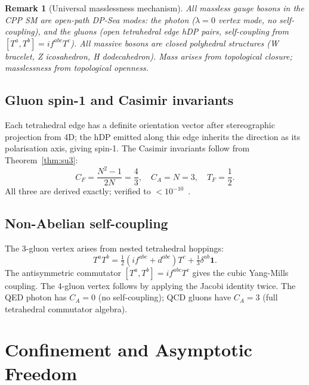 \documentclass[11pt,a4paper]{article}
\newtheorem{remark}[theorem]{Remark}
\begin{document}
\begin{remark}[Universal masslessness mechanism]
All massless gauge bosons in the CPP SM are open-path DP-Sea modes:
the photon ($\lambda=0$ vertex mode, no self-coupling), and the
gluons (open tetrahedral edge hDP pairs, self-coupling from
$[T^a,T^b]=if^{abc}T^c$).  All massive bosons are closed polyhedral
structures (W bracelet, Z icosahedron, H dodecahedron).  Mass arises
from topological closure; masslessness from topological openness.
\end{remark}

\subsection{Gluon spin-1 and Casimir invariants}

Each tetrahedral edge has a definite orientation vector after
stereographic projection from 4D; the hDP emitted along this edge
inherits the direction as its polarisation axis, giving spin-1.
The Casimir invariants follow from Theorem~\ref{thm:su3}:
\begin{equation}
C_F = \frac{N^2-1}{2N} = \frac{4}{3},\quad
C_A = N = 3,\quad
T_F = \frac{1}{2}.
\label{eq:casimirs}
\end{equation}
All three are derived exactly; verified to $<10^{-10}$~\citep{cpp_ss_mc}.

\subsection{Non-Abelian self-coupling}

The 3-gluon vertex arises from nested tetrahedral hoppings:
\begin{equation}
T^aT^b = \tfrac{1}{2}(if^{abc}+d^{abc})T^c + \tfrac{1}{3}\delta^{ab}\mathbf{1}.
\label{eq:TaTb}
\end{equation}
The antisymmetric commutator $[T^a,T^b] = if^{abc}T^c$ gives the
cubic Yang-Mills coupling.  The 4-gluon vertex follows by applying
the Jacobi identity twice.  The QED photon has $C_A = 0$ (no
self-coupling); QCD gluons have $C_A = 3$ (full tetrahedral
commutator algebra).

\section{Confinement and Asymptotic Freedom}
\label{sec:confinement}
\end{document}
